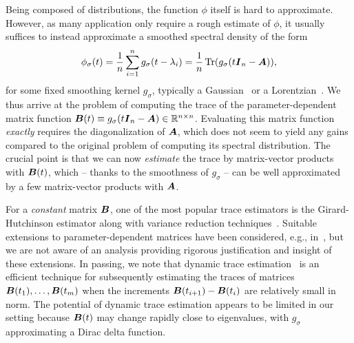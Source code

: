 Being composed of distributions, the function $\phi$ itself is hard to approximate. However, as many application only require a rough estimate of $\phi$, it usually suffices to instead approximate a smoothed spectral density of the form
\begin{equation}
    \phi_{\sigma}(t) = \frac{1}{n} \sum_{i=1}^{n} g_{\sigma}(t - \lambda_i) = \frac{1}{n} \operatorname{Tr}(g_{\sigma}(t \boldsymbol{I}_n - \boldsymbol{A})),
    \label{equ:smoothed-spectral-density}
\end{equation}
for some fixed smoothing kernel $g_{\sigma}$, typically a Gaussian~\cite{lin-2016-approximating-spectral, lin-2017-randomized-estimation} or a Lorentzian~\cite{haydock-1972-electronic-structure, lin-2016-approximating-spectral}. We thus arrive at the problem of computing the trace of the parameter-dependent matrix function $\boldsymbol{B}(t) \equiv g_{\sigma}(t \boldsymbol{I}_n - \boldsymbol{A}) \in \mathbb{R}^{n \times n}$. Evaluating this matrix function \emph{exactly} requires the diagonalization of $\boldsymbol{A}$, which does not seem to yield any gains compared to the original problem of computing its spectral distribution. The crucial point is that we can now \emph{estimate} the trace by matrix-vector products with $\boldsymbol{B}(t)$, which -- thanks to the smoothness of $g_\sigma$ -- can be well approximated by a few matrix-vector products with $\boldsymbol{A}$.

For a \emph{constant} matrix $\boldsymbol{B}$, one of the most popular trace estimators is the Girard-Hutchinson estimator \cite{girard-1989-fast-montecarlo, hutchinson-1990-stochastic-estimator} along with variance reduction techniques~\cite{gambhir-2017-deflation-method, saibaba-2017-randomized-matrixfree, lin-2017-randomized-estimation, meyer-2021-hutch-optimal, persson-2022-improved-variants, chen-2023-krylovaware-stochastic, epperly-2024-xtrace-making}. Suitable extensions to parameter-dependent matrices have been considered, e.g., in~\cite{lin-2017-randomized-estimation,chen-2023-krylovaware-stochastic}, but we are not aware of an analysis providing rigorous justification and insight of these extensions. In passing, we note that dynamic trace estimation~\cite{dharangutte-2024-dynamic-trace,woodruff-2024-optimal-query} is an efficient technique for subsequently estimating the traces of matrices $\boldsymbol{B}(t_1), \dots, \boldsymbol{B}(t_m)$ when the increments $\boldsymbol{B}(t_{i+1}) - \boldsymbol{B}(t_i)$ are relatively small in norm. The potential of dynamic trace estimation appears to be limited in our setting because $\boldsymbol{B}(t)$ may change rapidly close to eigenvalues, with $g_{\sigma}$ approximating a Dirac delta function.

